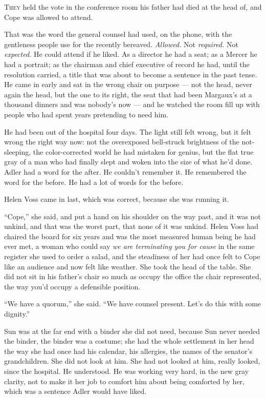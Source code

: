 \documentclass[11pt,openany]{book}
\begin{document}
\lettrine[lines=3, lhang=0.05, nindent=0.25em]{T}{hey} held the vote in the conference room his father had died at the head of, and Cope was allowed to attend.

That was the word the general counsel had used, on the phone, with the gentleness people use for the recently bereaved. \textit{Allowed.} Not \textit{required.} Not \textit{expected.} He could attend if he liked. As a director he had a seat; as a Mercer he had a portrait; as the chairman and chief executive of record he had, until the resolution carried, a title that was about to become a sentence in the past tense. He came in early and sat in the wrong chair on purpose --- not the head, never again the head, but the one to its right, the seat that had been Margaux's at a thousand dinners and was nobody's now --- and he watched the room fill up with people who had spent years pretending to need him.

He had been out of the hospital four days. The light still felt wrong, but it felt wrong the right way now: not the overexposed bell-struck brightness of the not-sleeping, the color-corrected world he had mistaken for genius, but the flat true gray of a man who had finally slept and woken into the size of what he'd done. Adler had a word for the after. He couldn't remember it. He remembered the word for the before. He had a lot of words for the before.

Helen Voss came in last, which was correct, because she was running it.

``Cope,'' she said, and put a hand on his shoulder on the way past, and it was not unkind, and that was the worst part, that none of it was unkind. Helen Voss had chaired the board for six years and was the most measured human being he had ever met, a woman who could say \textit{we are terminating you for cause} in the same register she used to order a salad, and the steadiness of her had once felt to Cope like an audience and now felt like weather. She took the head of the table. She did not sit in his father's chair so much as occupy the office the chair represented, the way you'd occupy a defensible position.

``We have a quorum,'' she said. ``We have counsel present. Let's do this with some dignity.''

Sun was at the far end with a binder she did not need, because Sun never needed the binder, the binder was a costume; she had the whole settlement in her head the way she had once had his calendar, his allergies, the names of the senator's grandchildren. She did not look at him. She had not looked at him, really looked, since the hospital. He understood. He was working very hard, in the new gray clarity, not to make it her job to comfort him about being comforted by her, which was a sentence Adler would have liked.
\end{document}
